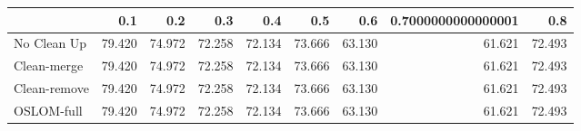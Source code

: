 \begin{tabular}{lrrrrrrrr}
\toprule
{} &    0.1 &    0.2 &    0.3 &    0.4 &    0.5 &    0.6 & 0.7000000000000001 &    0.8 \\
\midrule
No Clean Up  & 79.420 & 74.972 & 72.258 & 72.134 & 73.666 & 63.130 &             61.621 & 72.493 \\
Clean-merge  & 79.420 & 74.972 & 72.258 & 72.134 & 73.666 & 63.130 &             61.621 & 72.493 \\
Clean-remove & 79.420 & 74.972 & 72.258 & 72.134 & 73.666 & 63.130 &             61.621 & 72.493 \\
OSLOM-full   & 79.420 & 74.972 & 72.258 & 72.134 & 73.666 & 63.130 &             61.621 & 72.493 \\
\bottomrule
\end{tabular}
